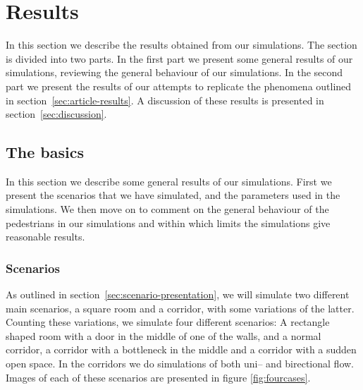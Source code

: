 \section{Results}
\label{sec:results}
In this section we describe the results obtained from our simulations.  The 
section is divided into two parts. In the first part we present some general 
results of our simulations, reviewing the general behaviour of our 
simulations. In the second part we present the results of our attempts to 
replicate the phenomena outlined in section~\ref{sec:article-results}. A 
discussion of these results is presented in section~\ref{sec:discussion}.

\subsection{The basics}
In this section we describe some general results of our simulations. 
First we present the scenarios that we have simulated, and the parameters 
used in the simulations. We then move on to comment on the general behaviour 
of the pedestrians in our simulations and within which limits the simulations 
give reasonable results.

\subsubsection{Scenarios}
As outlined in section~\ref{sec:scenario-presentation}, we will simulate two 
different main scenarios, a square room and a corridor, with some variations 
of the latter. Counting these variations, we simulate four different 
scenarios: A rectangle shaped room with a door in the middle of one of the 
walls, and a normal corridor, a corridor with a bottleneck in the middle and a 
corridor with a sudden open space. In the corridors we do simulations of both 
uni-- and birectional flow. Images of each of these scenarios are presented in 
figure \ref{fig:fourcases}.

